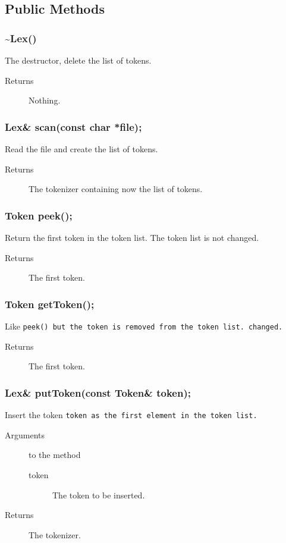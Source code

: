 \subsection{Public Methods}

\subsubsection{\~{ }Lex()}

The destructor, delete the list of tokens.
\begin{description}
  \item [Returns]  Nothing.
\end{description}

\subsubsection{Lex\& scan(const char *file);}
Read the file and create the list of
tokens. 
\begin{description}
  \item [Returns] The tokenizer containing now the list of tokens.
\end{description}

\subsubsection{Token peek();}
Return the first token in the token list. The token list is not
changed.
\begin{description}
  \item [Returns] The first token.
\end{description}

\subsubsection{Token getToken();}
Like \tt peek() \rm but the token is removed from
the token list. 
changed.
\begin{description}
  \item [Returns] The first token.
\end{description}

\subsubsection{Lex\& putToken(const Token\& token);}
Insert the token \tt token \rm as the first element in the token list. 
\begin{description}
  \item [Arguments] to the method
    \begin{description}
      \item [token] The token to be inserted.
    \end{description}
   \item [Returns] The tokenizer.
\end{description}

